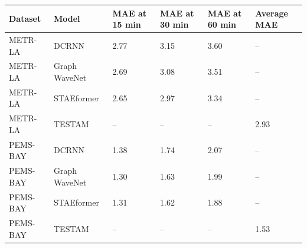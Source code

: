 \begin{tabular}{llllll}
\toprule
Dataset & Model & MAE at 15 min & MAE at 30 min & MAE at 60 min & Average MAE \\
\midrule
METR-LA & DCRNN & 2.77 & 3.15 & 3.60 & -- \\
METR-LA & Graph WaveNet & 2.69 & 3.08 & 3.51 & -- \\
METR-LA & STAEformer & 2.65 & 2.97 & 3.34 & -- \\
METR-LA & TESTAM & -- & -- & -- & 2.93 \\
PEMS-BAY & DCRNN & 1.38 & 1.74 & 2.07 & -- \\
PEMS-BAY & Graph WaveNet & 1.30 & 1.63 & 1.99 & -- \\
PEMS-BAY & STAEformer & 1.31 & 1.62 & 1.88 & -- \\
PEMS-BAY & TESTAM & -- & -- & -- & 1.53 \\
\bottomrule
\end{tabular}

